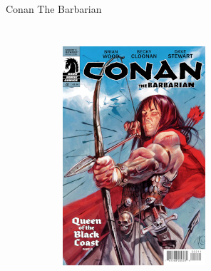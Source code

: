 \begin{frame}{Conan The Barbarian}
\begin{columns}
\begin{figure}[htp]
\begin{subfigure}[b]{0.23\textwidth}
				\includegraphics[width=\textwidth]{img/DH-CTB-02}
			\end{subfigure}
			~
			\begin{subfigure}[b]{0.23\textwidth}

\end{subfigure}
\end{figure}
\end{columns}
\end{frame}
